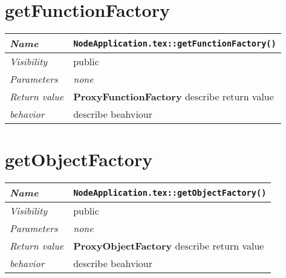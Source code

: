  \section{getFunctionFactory}
\begin{longtable}{p{3cm} @{\hskip 1cm} p{12cm}}
 \hline
\textit{Name} & \texttt{NodeApplication.tex::getFunctionFactory()}\\
\hline
 \textit{Visibility} & public\\
\hline
\textit{Parameters} & \textit{none}\\
\hline
\textit{Return value} & \textbf{ ProxyFunctionFactory} describe return value\\
  \hline
 \textit{behavior} & describe beahviour \\
\hline
\end{longtable} \pagebreak
 \section{getObjectFactory}
\begin{longtable}{p{3cm} @{\hskip 1cm} p{12cm}}
 \hline
\textit{Name} & \texttt{NodeApplication.tex::getObjectFactory()}\\
\hline
 \textit{Visibility} & public\\
\hline
\textit{Parameters} & \textit{none}\\
\hline
\textit{Return value} & \textbf{ ProxyObjectFactory} describe return value\\
  \hline
 \textit{behavior} & describe beahviour \\
\hline
\end{longtable} \pagebreak
 